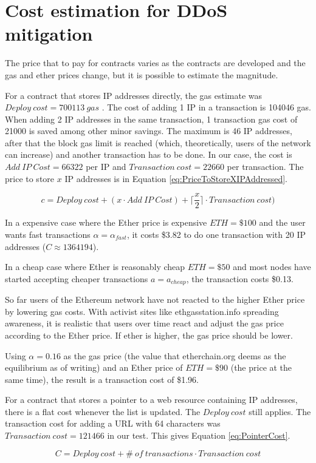 \section{Cost estimation for DDoS mitigation}

The price that to pay for contracts varies as the contracts are developed and the gas and ether prices change, but it is possible to estimate the magnitude.

For a contract that stores IP addresses directly, the gas estimate was $ Deploy\ cost = 700113\ gas$ . The cost of adding 1 IP in a transaction is 104046 gas. When adding 2 IP addresses in the same transaction, 1 transaction gas cost of 21000 is saved among other minor savings.  The maximum is 46 IP addresses, after that the block gas limit is reached (which, theoretically, users of the network can increase) and another transaction has to be done. In our case, the cost is $ Add \ IP\ Cost = 66322 $ per IP and $ Transaction\ cost = 22660 $ per transaction. The price to store $ x $ IP addresses is in Equation \ref{eq:PriceToStoreXIPAddressed}.

\begin{equation}
c = Deploy\ cost + (x \cdot Add\ IP\ Cost) + \lceil\frac{x}{2}\rceil \cdot Transaction\ cost)
\label{eq:PriceToStoreXIPAddressed}
\end{equation}

In a expensive case where the Ether price is expensive $ ETH = \$100 $ and the user wants fast transactions $ \alpha = \alpha_{fast} $, it costs \$3.82 to do one transaction with 20 IP addresses ($ C \approx 1364194 $).

In a cheap case where Ether is reasonably cheap $ ETH = \$50 $ and most nodes have started accepting cheaper transactions $ a = a_{cheap} $, the transaction costs \$0.13.

So far users of the Ethereum network have not reacted to the higher Ether price by lowering gas costs. With activist sites like ethgasstation.info spreading awareness, it is realistic that users over time react and adjust the gas price according to the Ether price. If ether is higher, the gas price should be lower.

Using $ \alpha = 0.16 $ as the gas price (the value that etherchain.org deems as the equilibrium as of writing) and an Ether price of $ ETH = \$90 $ (the price at the same time), the result is a transaction cost of \$1.96.

For a contract that stores a pointer to a web resource containing IP addresses, there is a flat cost whenever the list is updated. The $Deploy\ cost$ still applies. The transaction cost for adding a URL with 64 characters was $ Transaction\ cost = 121466 $ in our test. This gives Equation \ref{eq:PointerCost}.

\begin{equation}
    C = Deploy\ cost + \#\ of\ transactions \cdot Transaction\ cost
    \label{eq:PointerCost}
\end{equation}
